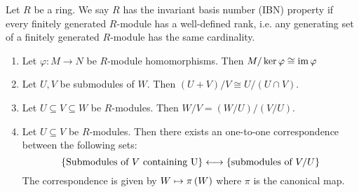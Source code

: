 \medskip

\begin{defn} 
    Let $R$ be a ring. We say $R$ has the invariant basis number (IBN) property if every finitely generated $R$-module has a well-defined rank, i.e. any generating set of a finitely generated $R$-module has the same cardinality.
\end{defn}

\medskip

\begin{thm} 
    \hfill
    \begin{enumerate}
        \item Let $\varphi:M\to N$ be $R$-module homomorphisms. Then $M/\ker\varphi \cong \operatorname{im}\varphi$
        \item Let $U,V$ be submodules of $W$. Then $(U+V)/V \cong U/(U\cap V)$.
        \item Let $U\subseteq V\subseteq W$ be $R$-modules. Then $W/V = (W/U) /(V/U)$.
        \item Let $U\subseteq V$ be $R$-modules. Then there exists an one-to-one correspondence between the following sets:
        \[\left\{\text{Submodules of $V$ containing U}\right\}\longleftrightarrow \left\{\text{submodules of $V/U$}\right\}\]
        The correspondence is given by $W\mapsto \pi \left(W\right)$ where $\pi$ is the canonical map.
    \end{enumerate}
\end{thm}

\medskip